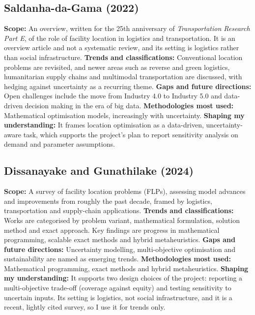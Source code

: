 \documentclass[pdflatex,sn-mathphys-num]{sn-jnl}
\begin{document}
\subsection{Saldanha-da-Gama (2022) \cite{saldanha2022}}
\textbf{Scope:} An overview, written for the 25th anniversary of \emph{Transportation Research Part E}, of the role of facility location in logistics and transportation. It is an overview article and not a systematic review, and its setting is logistics rather than social infrastructure.
\textbf{Trends and classifications:} Conventional location problems are revisited, and newer areas such as reverse and green logistics, humanitarian supply chains and multimodal transportation are discussed, with hedging against uncertainty as a recurring theme.
\textbf{Gaps and future directions:} Open challenges include the move from Industry 4.0 to Industry 5.0 and data-driven decision making in the era of big data.
\textbf{Methodologies most used:} Mathematical optimisation models, increasingly with uncertainty.
\textbf{Shaping my understanding:} It frames location optimisation as a data-driven, uncertainty-aware task, which supports the project's plan to report sensitivity analysis on demand and parameter assumptions.

\subsection{Dissanayake and Gunathilake (2024) \cite{dissanayake2024}}
\textbf{Scope:} A survey of facility location problems (FLPs), assessing model advances and improvements from roughly the past decade, framed by logistics, transportation and supply-chain applications.
\textbf{Trends and classifications:} Works are categorised by problem variant, mathematical formulation, solution method and exact approach. Key findings are progress in mathematical programming, scalable exact methods and hybrid metaheuristics.
\textbf{Gaps and future directions:} Uncertainty modelling, multi-objective optimisation and sustainability are named as emerging trends.
\textbf{Methodologies most used:} Mathematical programming, exact methods and hybrid metaheuristics.
\textbf{Shaping my understanding:} It supports two design choices of the project: reporting a multi-objective trade-off (coverage against equity) and testing sensitivity to uncertain inputs. Its setting is logistics, not social infrastructure, and it is a recent, lightly cited survey, so I use it for trends only.
\end{document}
